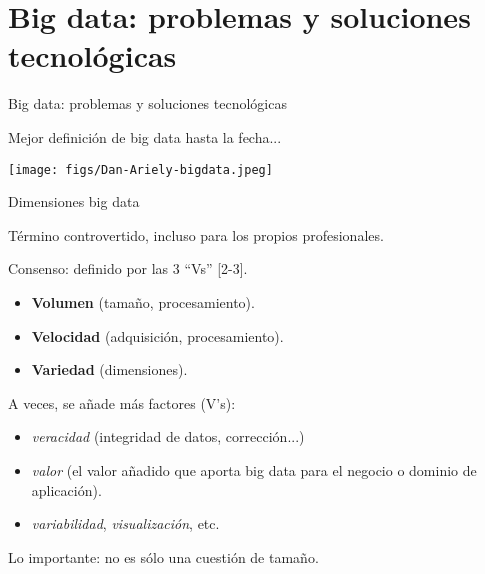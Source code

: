 %
%
%
\section{Big data: problemas y soluciones tecnológicas}


\begin{frame}{}
\begin{center}
 \huge Big data: problemas y soluciones tecnológicas
\end{center}
\end{frame}


\begin{frame}{Mejor definición de big data hasta la fecha...}
\begin{center}
    \texttt{[image: figs/Dan-Ariely-bigdata.jpeg]}
\end{center}
\end{frame}


\begin{frame}{Dimensiones big data}
\begin{wideitemize}
 \item Término controvertido, incluso para los propios profesionales.
 \item Consenso: definido por las 3 ``Vs'' [2-3].
 \begin{itemize}
  \item \textbf{Volumen} (tamaño, procesamiento).
  \item \textbf{Velocidad} (adquisición, procesamiento).
  \item \textbf{Variedad} (dimensiones).
 \end{itemize}
 \item A veces, se añade más factores (V's):
 \begin{itemize}
  \item \textit{veracidad} (integridad de datos, corrección...)
  \item \textit{valor} (el valor añadido que
 aporta big data para el negocio o dominio de aplicación).
  \item \textit{variabilidad}, \textit{visualización}, etc.
 \end{itemize}

 \item Lo importante: no es sólo una cuestión de tamaño.
\end{wideitemize}
 
\end{frame}

